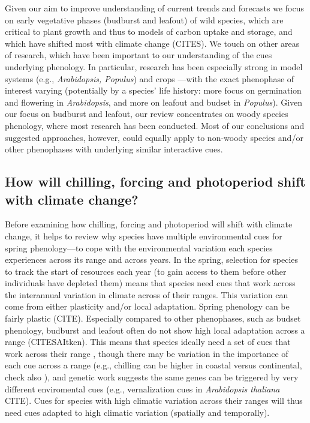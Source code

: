 \documentclass[11pt,letter]{article}
\begin{document}
Given our aim to improve understanding of current trends and forecasts we focus on early vegetative phases (budburst and leafout) of wild species, which are critical to plant growth and thus to models of carbon uptake and storage, and which have shifted most with climate change (CITES). We touch on other areas of research, which have been important to our understanding of the cues underlying phenology. In particular, research has been especially strong in model systems (e.g., \emph{Arabidopsis, Populus}) and crops \citep{cesaraccio2004}---with the exact phenophase of interest varying (potentially by a species' life history: more focus on germination and flowering in \emph{Arabidopsis}, and more on leafout and budset in \emph{Populus}).  Given our focus on budburst and leafout, our review concentrates on woody species phenology, where most research has been conducted. Most of our conclusions and suggested approaches, however, could equally apply to non-woody species and/or other phenophases with underlying similar interactive cues.\\ 

\subsection{How will chilling, forcing and photoperiod shift with climate change?}
Before examining how chilling, forcing and photoperiod will shift with climate change, it helps to review why species have multiple environmental cues for spring phenology---to cope with the environmental variation each species experiences across its range and across years. In the spring, selection for species to track the start of resources each year (to gain access to them before other individuals have depleted them) means that species need cues that work across the interannual variation in climate across of their ranges. This variation can come from either plasticity and/or local adaptation. Spring phenology can be fairly plastic (CITE). Especially compared to other phenophases, such as budset phenology, budburst and leafout often do not show high local adaptation across a range (CITESAItken). This means that species ideally need a set of cues that work across their range \citep{liepe2016}, though there may be variation in the importance of each cue across a range (e.g., chilling can be higher in coastal versus continental, check also \citet{legave2013}), and genetic work suggests the same genes can be triggered by very different enviromental cues (e.g., vernalization cues in \emph{Arabidopsis thaliana} CITE). Cues for species with high climatic variation across their ranges will thus need cues adapted to high climatic variation (spatially and temporally).\\
\end{document}
